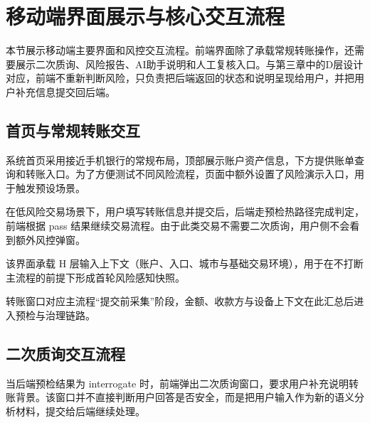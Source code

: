 \documentclass{xduugthesis}
\begin{document}
\section{移动端界面展示与核心交互流程}

本节展示移动端主要界面和风控交互流程。前端界面除了承载常规转账操作，还需要展示二次质询、风险报告、AI助手说明和人工复核入口。与第三章中的D层设计对应，前端不重新判断风险，只负责把后端返回的状态和说明呈现给用户，并把用户补充信息提交回后端。

\subsection{首页与常规转账交互}

系统首页采用接近手机银行的常规布局，顶部展示账户资产信息，下方提供账单查询和转账入口。为了方便测试不同风险流程，页面中额外设置了风险演示入口，用于触发预设场景。

在低风险交易场景下，用户填写转账信息并提交后，后端走预检热路径完成判定，前端根据 pass 结果继续交易流程。由于此类交易不需要二次质询，用户侧不会看到额外风控弹窗。

该界面承载 H 层输入上下文（账户、入口、城市与基础交易环境），用于在不打断主流程的前提下形成首轮风险感知快照。

转账窗口对应主流程“提交前采集”阶段，金额、收款方与设备上下文在此汇总后进入预检与治理链路。


\subsection{二次质询交互流程}

当后端预检结果为 interrogate 时，前端弹出二次质询窗口，要求用户补充说明转账背景。该窗口并不直接判断用户回答是否安全，而是把用户输入作为新的语义分析材料，提交给后端继续处理。
\end{document}
